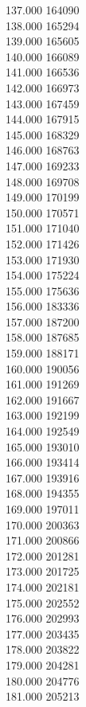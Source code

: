 { 137.000	164090 \\
 138.000	165294 \\
 139.000	165605 \\
 140.000	166089 \\
 141.000	166536 \\
 142.000	166973 \\
 143.000	167459 \\
 144.000	167915 \\
 145.000	168329 \\
 146.000	168763 \\
 147.000	169233 \\
 148.000	169708 \\
 149.000	170199 \\
 150.000	170571 \\
 151.000	171040 \\
 152.000	171426 \\
 153.000	171930 \\
 154.000	175224 \\
 155.000	175636 \\
 156.000	183336 \\
 157.000	187200 \\
 158.000	187685 \\
 159.000	188171 \\
 160.000	190056 \\
 161.000	191269 \\
 162.000	191667 \\
 163.000	192199 \\
 164.000	192549 \\
 165.000	193010 \\
 166.000	193414 \\
 167.000	193916 \\
 168.000	194355 \\
 169.000	197011 \\
 170.000	200363 \\
 171.000	200866 \\
 172.000	201281 \\
 173.000	201725 \\
 174.000	202181 \\
 175.000	202552 \\
 176.000	202993 \\
 177.000	203435 \\
 178.000	203822 \\
 179.000	204281 \\
 180.000	204776 \\
 181.000	205213 \\
}
